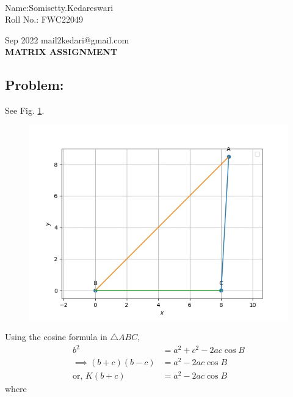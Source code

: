 \documentclass[10pt,a4paper]{report}
\begin{document}
 \vspace{3mm}\\ \raggedleft Name:Somisetty.Kedareswari\vspace{2mm}\\ \raggedleft Roll No.: FWC22049\vspace{2mm}\\ \raggedright Sep 2022 \hspace{12cm} \raggedleft mail2kedari@gmail.com \vspace{10mm}
\\ \centering \Large \textbf{MATRIX ASSIGNMENT} \normalsize \vspace{15mm}
\begin{multicols}{2}
\section{Problem:}  
\fi
	\solution 
	See Fig. 
		\ref{fig:9/11/2/2}.
	\begin{figure}[!h]
		\centering
 \includegraphics[width=\columnwidth]{chapters/9/11/2/2/figs/Fig.png}
		\caption{}
		\label{fig:9/11/2/2}
  	\end{figure}
	Using the cosine formula in  $\triangle ABC$,
\begin{align}
	{b}^2&= {a}^2 + {c}^2 - 2ac\cos{B}
\\
\implies	(b+c)(b-c) &= {a}^2- 2  a  c\cos{B}
\\
	\text{or, }K(b+c) &= {a}^2- 2  a  c\cos{B}
		\label{fig:9/11/2/2/k}
\end{align}
%
where
\begin{align}

\end{align}
\end{multicols}
\end{document}

